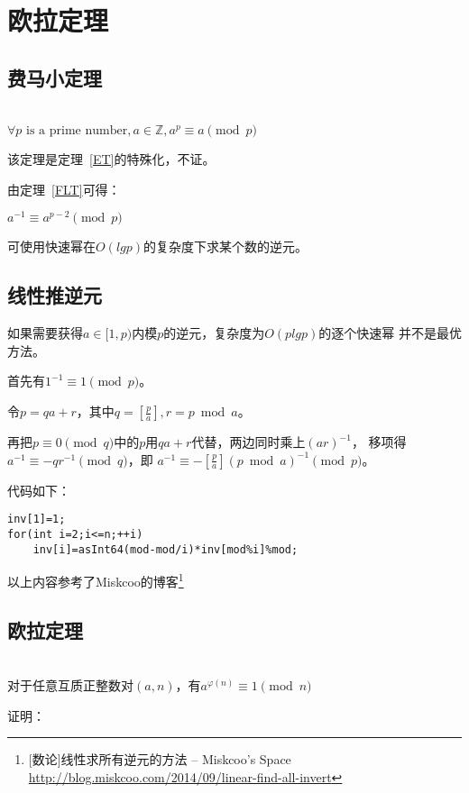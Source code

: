 \section{欧拉定理}
\subsection{费马小定理}\label{FLTS}
\begin{theorem}\label{FLT}
	~\\
	$\forall p \textrm{ is a prime number},a\in \mathbb{Z},a^p \equiv a \pmod{p}$
\end{theorem}

该定理是定理~\ref{ET}的特殊化，不证。

由定理~\ref{FLT}可得：

\begin{inference}
	$a^{-1} \equiv a^{p-2} \pmod{p}$
\end{inference}

可使用快速幂在$O(lgp)$的复杂度下求某个数的逆元。

\subsection{线性推逆元}

如果需要获得$a\in [1,p)$内模$p$的逆元，复杂度为$O(plgp)$的逐个快速幂
并不是最优方法。

首先有$1^{-1}\equiv 1 \pmod{p}$。

令$p=qa+r$，其中$q=[\frac{p}{a}],r=p \bmod a$。

再把$p \equiv 0 \pmod{q}$中的$p$用$qa+r$代替，两边同时乘上$(ar)^{-1}$，
移项得$a^{-1}\equiv -qr^{-1} \pmod{q}$，即
$a^{-1}\equiv -[\frac{p}{a}](p \bmod a)^{-1} \pmod{p}$。

代码如下：
\begin{lstlisting}[title=inv]
inv[1]=1;
for(int i=2;i<=n;++i)
    inv[i]=asInt64(mod-mod/i)*inv[mod%i]%mod;
\end{lstlisting}

以上内容参考了Miskcoo的博客\footnote{[数论]线性求所有逆元的方法 – Miskcoo's Space\\
	\url{http://blog.miskcoo.com/2014/09/linear-find-all-invert}}

\subsection{欧拉定理}
\begin{theorem}\label{ET}
	~\\
	对于任意互质正整数对$(a,n)$，有$a^{\varphi(n)} \equiv 1 \pmod{n}$
\end{theorem}
证明：

